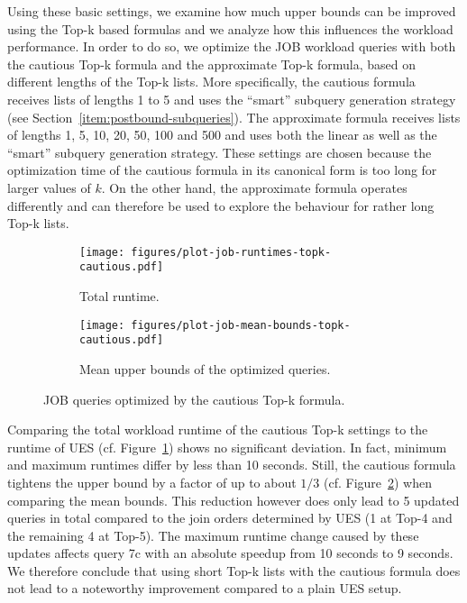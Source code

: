 Using these basic settings, we examine how much upper bounds can be improved using the Top-k based formulas and we analyze how this influences the workload performance. In order to do so, we optimize the JOB workload queries with both the cautious Top-k formula and the approximate Top-k formula, based on different lengths of the Top-k lists. More specifically, the cautious formula receives lists of lengths 1 to 5 and uses the ``smart'' subquery generation strategy (see Section~\ref{item:postbound-subqueries}). The approximate formula receives lists of lengths 1, 5, 10, 20, 50, 100 and 500 and uses both the linear as well as the ``smart'' subquery generation strategy. These settings are chosen because the optimization time of the cautious formula in its canonical form is too long for larger values of $k$. On the other hand, the approximate formula operates differently and can therefore be used to explore the behaviour for rather long Top-k lists.

\begin{figure}[tb]
	\centering
	\begin{subfigure}[b]{0.47\textwidth}
	    \centering
	    \texttt{[image: figures/plot-job-runtimes-topk-cautious.pdf]}
	    \caption{Total runtime.}
	    \label{fig:results-job-runtimes-cautious}
	\end{subfigure}
	\begin{subfigure}[b]{0.47\textwidth}
	    \centering
	    \texttt{[image: figures/plot-job-mean-bounds-topk-cautious.pdf]}
	    \caption{Mean upper bounds of the optimized queries.}
	    \label{fig:results-job-bounds-cautious}
	\end{subfigure}
	\caption{JOB queries optimized by the cautious Top-k formula.}
	\label{fig:results-job-cautious}
\end{figure}

Comparing the total workload runtime of the cautious Top-k settings to the runtime of UES (cf. Figure~\ref{fig:results-job-runtimes-cautious}) shows no significant deviation. In fact, minimum and maximum runtimes differ by less than 10 seconds. Still, the cautious formula tightens the upper bound by a factor of up to about $1/3$ (cf. Figure~\ref{fig:results-job-bounds-cautious}) when comparing the mean bounds. This reduction however does only lead to 5 updated queries in total compared to the join orders determined by UES (1 at Top-4 and the remaining 4 at Top-5). The maximum runtime change caused by these updates affects query 7c with an absolute speedup from 10 seconds to 9 seconds. We therefore conclude that using short Top-k lists with the cautious formula does not lead to a noteworthy improvement compared to a plain UES setup.


